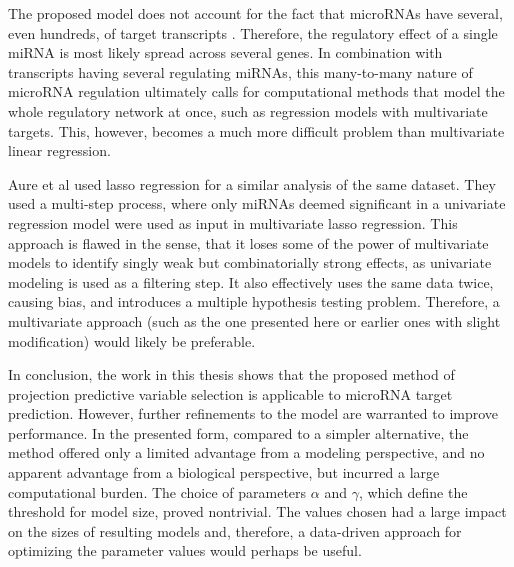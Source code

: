 
The proposed model does not account for the fact that microRNAs have
several, even hundreds, of target transcripts \citep{Friedman2009}. Therefore, the
regulatory effect of a single miRNA is most likely spread across several
genes. In combination with transcripts having several regulating miRNAs, this
many-to-many nature of microRNA regulation ultimately calls for computational
methods that model the whole regulatory network at once, such as regression
models with multivariate targets. This, however, becomes a much more difficult
problem than multivariate linear regression.

Aure et al \citep{Aure2015} used lasso regression for a similar analysis of the same dataset.
They used a multi-step process, where only miRNAs deemed
significant in a univariate regression model were used as input in multivariate
lasso regression. This approach is flawed in the sense, that it loses some of
the power of multivariate models to identify singly weak but combinatorially
strong effects, as univariate modeling is used as a filtering step. It also
effectively uses the same data twice, causing bias, and introduces a
multiple hypothesis testing problem. Therefore, a multivariate
approach (such as the one presented here or earlier ones with slight modification)
would likely be preferable.

In conclusion, the work in this thesis shows that the proposed method of
projection predictive variable selection is applicable to microRNA target
prediction. However, further refinements to the model are warranted to improve
performance. In the presented form, compared to a simpler alternative, the
method offered only a limited advantage from a modeling perspective, and no
apparent advantage from a biological perspective, but incurred a large
computational burden. The choice of parameters $\alpha$ and $\gamma$, which
define the threshold for model size, proved nontrivial. The values chosen
had a large impact on the sizes of resulting models and, therefore,
a data-driven approach for optimizing the parameter values would perhaps be useful.




